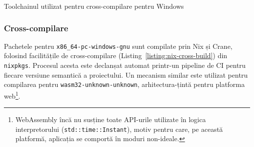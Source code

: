 \documentclass[a4paper]{article}
\begin{document}
\begin{listing}
	\inputminted{nix}{codeblocks/cross.nix}
	\caption{Toolchainul utilizat pentru cross-compilare pentru Windows}
	\label{listing:nix-cross-build}
\end{listing}

\subsubsection{Cross-compilare}
Pachetele pentru \texttt{x86\_64-pc-windows-gnu} sunt compilate prin Nix și Crane, folosind facilitățile de cross-compilare (Listing~\ref{listing:nix-cross-build})
din \texttt{nixpkgs}. Procesul acesta este declanșat automat printr-un pipeline de CI pentru fiecare versiune semantică a proiectului. Un
mecanism similar este utilizat pentru compilarea pentru \texttt{wasm32-unknown-unknown}, arhitectura-țintă pentru platforma web\footnote{
	WebAssembly încă nu susține toate API-urile utilizate în logica interpretorului (\texttt{std::time::Instant}),
	motiv pentru care, pe această platformă, aplicația se comportă în moduri non-ideale.}.

\end{document}
